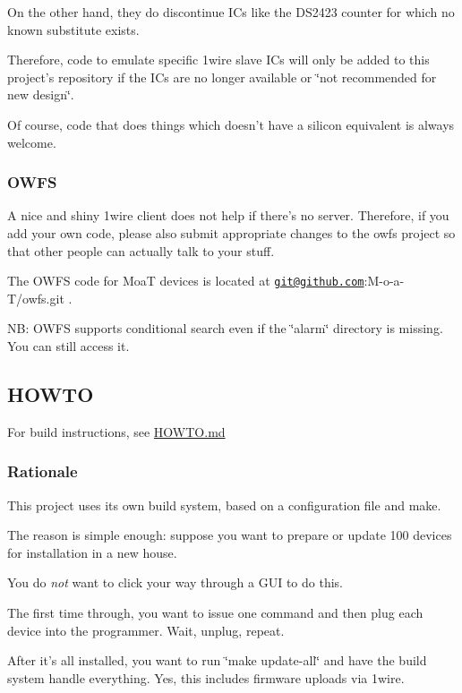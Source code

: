 On the other hand, they do discontinue I\-Cs like the D\-S2423 counter for which no known substitute exists.

Therefore, code to emulate specific 1wire slave I\-Cs will only be added to this project's repository if the I\-Cs are no longer available or \char`\"{}not
recommended for new design\char`\"{}.

Of course, code that does things which doesn't have a silicon equivalent is always welcome.

\subsubsection*{O\-W\-F\-S}

A nice and shiny 1wire client does not help if there's no server. Therefore, if you add your own code, please also submit appropriate changes to the owfs project so that other people can actually talk to your stuff.

The O\-W\-F\-S code for Moa\-T devices is located at \href{mailto:git@github.com}{\tt git@github.\-com}\-:M-\/o-\/a-\/\-T/owfs.\-git .

N\-B\-: O\-W\-F\-S supports conditional search even if the \char`\"{}alarm\char`\"{} directory is missing. You can still access it.

\subsection*{H\-O\-W\-T\-O}

For build instructions, see \hyperlink{HOWTO_8md}{H\-O\-W\-T\-O.\-md}

\subsubsection*{Rationale}

This project uses its own build system, based on a configuration file and {\ttfamily make}.

The reason is simple enough\-: suppose you want to prepare or update 100 devices for installation in a new house.

You do {\itshape not} want to click your way through a G\-U\-I to do this.

The first time through, you want to issue one command and then plug each device into the programmer. Wait, unplug, repeat.

After it's all installed, you want to run \char`\"{}make update-\/all\char`\"{} and have the build system handle everything. Yes, this includes firmware uploads via 1wire.

